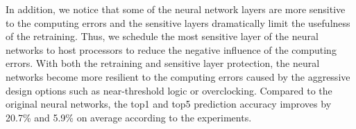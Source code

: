 In addition, we notice that some of the neural network layers
are more sensitive to the computing errors and the sensitive
layers dramatically limit the usefulness of the retraining. Thus,
we schedule the most sensitive layer of the neural networks
to host processors to reduce the negative influence of the
computing errors. With both the retraining and sensitive layer
protection, the neural networks become more resilient to the
computing errors caused by the aggressive design options
such as near-threshold logic or overclocking. Compared to the
original neural networks, the top1 and top5 prediction accuracy
improves by 20.7\% and 5.9\% on average according to the
experiments.

%
%
%

